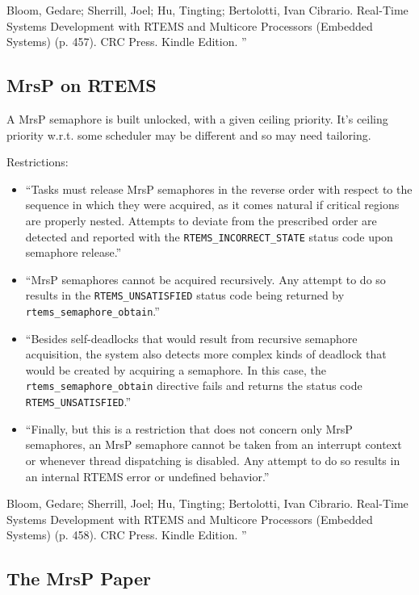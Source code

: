 Bloom, Gedare; Sherrill, Joel; Hu, Tingting; Bertolotti, Ivan Cibrario. Real-Time Systems Development with RTEMS and Multicore Processors (Embedded Systems) (p. 457). CRC Press. Kindle Edition. ''

\subsection{MrsP on RTEMS}

A MrsP semaphore is built unlocked, with a given ceiling priority.
It's ceiling priority w.r.t. some scheduler may be different
and so may need tailoring.

Restrictions:
\begin{itemize}
  \item
    ``Tasks must release MrsP semaphores in the reverse order
      with respect to the sequence in which they were acquired,
      as it comes natural if critical regions are properly nested.
      Attempts to deviate from the prescribed order
      are detected and reported with
      the \verb"RTEMS_INCORRECT_STATE" status code upon semaphore release.''
  \item
    ``MrsP semaphores cannot be acquired recursively.
    Any attempt to do so results in
    the \verb"RTEMS_UNSATISFIED" status code being returned
    by \verb"rtems_semaphore_obtain".''
  \item
    ``Besides self-deadlocks
      that would result from recursive semaphore acquisition,
      the system also detects more complex kinds of deadlock
      that would be created by acquiring a semaphore.
      In this case, the \verb"rtems_semaphore_obtain" directive fails
      and returns the status code  \verb"RTEMS_UNSATISFIED".''
  \item
    ``Finally,
      but this is a restriction that does not concern only MrsP semaphores,
      an MrsP semaphore cannot be taken from an interrupt context
      or whenever thread dispatching is disabled.
      Any attempt to do so results in an internal RTEMS error
      or undefined behavior.''
\end{itemize}

Bloom, Gedare; Sherrill, Joel; Hu, Tingting; Bertolotti, Ivan Cibrario. Real-Time Systems Development with RTEMS and Multicore Processors (Embedded Systems) (p. 458). CRC Press. Kindle Edition. ''


\subsection{The MrsP Paper}

